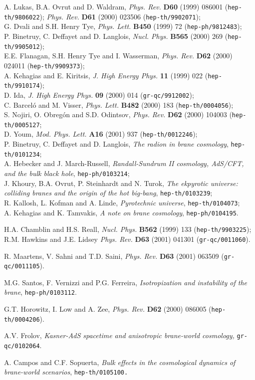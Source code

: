 \documentclass[prd,a4paper,twocolumn,superscriptaddress,nofootinbib,showpacs]{revtex4}
\def\npb#1#2#3{{\it Nucl. Phys.} {\bf B#1} (#2) #3 }
\def\plb#1#2#3{{\it Phys. Lett.} {\bf B#1} (#2) #3 }
\def\prd#1#2#3{{\it Phys. Rev. } {\bf D#1} (#2) #3 }
\def\mpla#1#2#3{{\it Mod. Phys. Lett.} {\bf A#1} (#2) #3 }
\def\bb#1{{\tt hep-th/#1}}
\def\grqc#1{{\tt gr-qc/#1}}
\def\heph#1{{\tt hep-ph/#1}}
\def\jhep#1#2#3{{\it J. High Energy Phys.} {\bf #1} (#2) #3 }
\begin{document}
\begin{thebibliography}{99}
A. Lukas, B.A. Ovrut and D. Waldram, \prd{60}{1999}{086001} (\bb{9806022});
\prd{61}{2000}{023506} (\bb{9902071});\\
G. Dvali and S.H. Henry Tye, \plb{450}{1999}{72} (\heph{9812483});\\
P. Binetruy, C. Deffayet and D. Langlois, \npb{565}{2000}{269} (\bb{9905012});\\
E.E. Flanagan, S.H. Henry Tye and I. Wasserman, \prd{62}{2000}{024011} (\bb{9909373});\\
A. Kehagias and E. Kiritsis, \jhep{11}{1999}{022} (\bb{9910174});\\
D. Ida, \jhep{09}{2000}{014} (\grqc{9912002});\\
C. Barcel\'o and M. Visser, \plb{482}{2000}{183} (\bb{0004056});\\
S. Nojiri, O. Obreg\'on and S.D. Odintsov, \prd{62}{2000}{104003} (\bb{0005127};\\
D. Youm, \mpla{16}{2001}{937} (\bb{0012246});\\
P. Binetruy, C. Deffayet and D. Langlois, {\it The radion in brane cosmology}, \bb{0101234};\\
A. Hebecker and J. March-Russell, {\it Randall-Sundrum II cosmology, AdS/CFT, and the bulk black
hole}, \heph{0103214};\\
J. Khoury, B.A. Ovrut, P. Steinhardt and N. Turok, {\it The ekpyrotic universe: colliding branes and 
the origin of the hot big-bang}, \bb{0103239};\\
R. Kallosh, L. Kofman and A. Linde, {\it Pyrotechnic universe}, \bb{0104073};\\
A. Kehagias and K. Tamvakis, {\it A note on brane cosmology}, \heph{0104195}.

H.A. Chamblin and H.S. Reall, \npb{562}{1999}{133} (\bb{9903225});\\
R.M. Hawkins and J.E. Lidsey \prd{63}{2001}{041301} (\grqc{0011060}).

R. Maartens, V. Sahni and T.D. Saini, \prd{63}{2001}{063509} (\grqc{0011105}).

M.G. Santos, F. Vernizzi and P.G. Ferreira, {\it Isotropization and instability
of the brane}, \heph{0103112}.

G.T. Horowitz, I. Low and A. Zee, \prd{62}{2000}{086005} (\bb{0004206}).

A.V. Frolov, {\it Kasner-AdS spacetime and anisotropic brane-world cosmology,}
\grqc{0102064}.

A. Campos and C.F. Sopuerta, {\it Bulk effects in the cosmological 
dynamics of brane-world scenarios}, \bb{0105100.}


\end{thebibliography}
\end{document}
